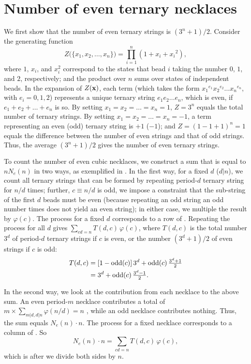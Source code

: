 \documentclass[twocolumn]{revtex4-1}
\begin{document}
\section{\label{apd:tnecklace}Number of even ternary necklaces}

We first show that the number of even ternary strings is $(3^n + 1)/2$.
%
Consider the generating function
\[
  Z\big(\{x_1, x_2,\dots, x_n\}\big) = \prod_{i=1}^n (1+x_i+{x_i}^2),
\]
where $1$, $x_i$, and $x_i^2$ correspond to the states that bead $i$
taking the number $0$, $1$, and $2$, respectively;
and the product over $n$ sums over states of independent beads.
%
In the expansion of $Z(\mathbf{x})$,
 each term (which takes the form
  ${x_1}^{e_1} {x_2}^{e_2} \dots {x_n}^{e_n}$,
  with $e_i = 0, 1, 2$)
represents a unique ternary string $e_1 e_2 \dots e_n$,
which is even, if $e_1 + e_2 + \dots + e_n$ is so.
%
By setting $x_1 = x_2 = \dots = x_n = 1$,
$Z=3^n$ equals the total number of ternary strings.
%
By setting $x_1 = x_2 = \dots = x_n = -1$,
a term representing an even (odd) ternary string
  is $+1$ ($-1$);
and $Z=(1-1+1)^n=1$
equals the difference between the number of even strings
  and that of odd strings.
%
Thus, the average $(3^n+1)/2$
gives the number of even ternary strings.


To count the number of even cubic necklaces,
we construct a sum that is equal to $n N_e(n)$ in two ways,
as exemplified in .
%
In the first way,
  for a fixed $d$ ($d|n$),
  we count all ternary strings
    that can be formed by repeating period-$d$ ternary string
    for $n/d$ times;
  further, $c\equiv n/d$ is odd,
    we impose a constraint that
    the sub-string of the first $d$ beads must be even
    (because repeating an odd string an odd number times
    does not yield an even string);
  in either case, we multiple the result by $\varphi(c)$.
%
The process for a fixed $d$ corresponds to a row of .
%
Repeating the process for all $d$ gives
  $\sum_{cd = n} T(d, c) \, \varphi(c)$,
  where $T(d, c)$ is the total number $3^d$ of period-$d$ ternary strings if $c$ is even,
  or the number $(3^d+1)/2$ of even strings if $c$ is odd:
%
\begin{align*}
  T(d, c) &= [1 - \mathrm{odd}(c)] \, 3^d + \mathrm{odd}(c) \, \tfrac{3^d + 1}{2} \\
          &= 3^d + \mathrm{odd}(c) \, \tfrac{3^d - 1}{2}.
\end{align*}


In the second way,
  we look at the contribution from each necklace to the above sum.
An even period-$m$ necklace contributes a total of
  $m \times \sum_{m|d, d|n} \varphi(n/d) = n$
  ,
  while an odd necklace contributes nothing.
Thus, the sum equals $N_e(n)\cdot n$.
%
The process for a fixed necklace corresponds to
  a column of .
%
%
So
\[
  N_e(n) \cdot n = \sum_{cd = n} T(d, c) \, \varphi(c),
\]
which is 
after we divide both sides by $n$.
\end{document}
